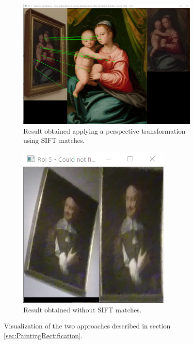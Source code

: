 \documentclass[10pt,twocolumn,letterpaper]{article}
\begin{document}
\begin{figure}[t]
\begin{subfigure}[b]{\linewidth}
    \includegraphics[width=\linewidth]{images/image10.png}
    \caption{Result obtained applying a perspective transformation using SIFT matches.}
    \label{fig:PaintingRectificationSIFT}
\end{subfigure}
\begin{subfigure}[b]{\linewidth}
    \hspace{1.2cm}
    \includegraphics[width=0.7\linewidth]{images/image7.png}
    \caption{Result obtained without SIFT matches.}
    \label{fig:PaintingRectificationNoSIFT}
\end{subfigure}
\caption{Visualization of the two approaches described in section \ref{sec:PaintingRectification}.}
\label{fig:PaintingRectificationImages}
\end{figure}
\end{document}
